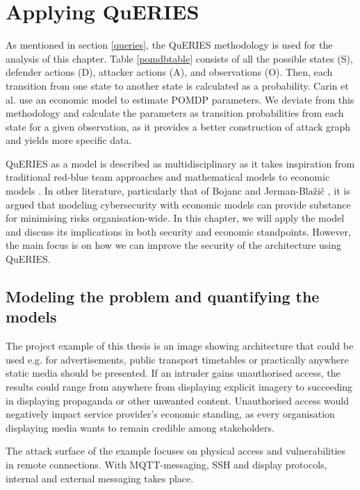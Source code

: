 \chapter{Applying QuERIES} \label{analysis}

As mentioned in section \ref{queries}, the
QuERIES methodology is used for the analysis of this chapter. Table
\ref{pomdbtable} consists of all the possible states (S), defender
actions (D), attacker actions (A), and observations (O). Then, each
transition from one state to another state is calculated as a
probability. Carin et al. \cite{carin2008cybersecurity} use an economic model to estimate POMDP
parameters. We deviate from this 
methodology and calculate the parameters as transition probabilities
from each state for a given observation, as it provides a better
construction of attack graph and yields more specific data.

QuERIES as a model is described as multidisciplinary as it takes
inspiration from traditional red-blue team approaches and mathematical
models to economic models \cite{hughes2013quantitative}. In other
literature, particularly that of Bojanc and Jerman-Blažič \cite{jerman2008economic}, it is argued that
modeling cybersecurity with economic models can provide substance for
minimising risks organisation-wide. In this
chapter, we will apply the model and discuss its implications in both
security and economic standpoints. However, the main focus is on how we can improve the security of the architecture using QuERIES. 

\section{Modeling the problem and quantifying the models} \label{modprob}

The project example of this thesis is an image showing architecture
that could be used e.g. for advertisements, public transport timetables
or practically anywhere static media should be presented. If an
intruder gains unauthorised access, the results could range from
anywhere from displaying explicit imagery to succeeding in displaying
propaganda or other unwanted content. Unauthorised access would negatively impact 
service provider's economic standing, as every
organisation displaying media wants to remain credible among
stakeholders.

The attack surface of the example focuses on physical access
and vulnerabilities in remote connections. With MQTT-messaging, SSH
and display protocols, internal and external messaging takes place.


